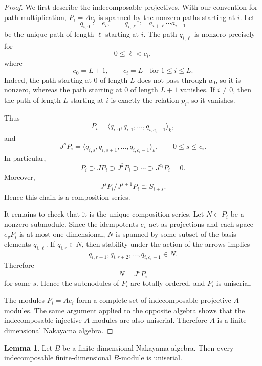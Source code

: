 \documentclass[11pt]{article}
\theoremstyle{definition}
\newtheorem{lemma}[theorem]{Lemma}
\begin{document}
\begin{proof}
We first describe the indecomposable projectives. With our convention for
path multiplication, \(P_i=Ae_i\) is spanned by the nonzero paths starting
at \(i\). Let
\[
q_{i,0}:=e_i,
\qquad
q_{i,\ell}:=a_{i+\ell}\cdots a_{i+1}
\]
be the unique path of length \(\ell\) starting at \(i\). The path \(q_{i,\ell}\)
is nonzero precisely for
\[
0\leq \ell<c_i,
\]
where
\[
c_0=L+1,
\qquad
c_i=L \quad \text{for } 1\leq i\leq L.
\]
Indeed, the path starting at \(0\) of length \(L\) does not pass through
\(a_0\), so it is nonzero, whereas the path starting at \(0\) of length
\(L+1\) vanishes. If \(i\neq 0\), then the path of length \(L\) starting
at \(i\) is exactly the relation \(p_i\), so it vanishes.

Thus
\[
P_i=\langle q_{i,0},q_{i,1},\ldots,q_{i,c_i-1}\rangle_k,
\]
and
\[
J^s P_i
=
\langle q_{i,s},q_{i,s+1},\ldots,q_{i,c_i-1}\rangle_k,
\qquad
0\leq s\leq c_i.
\]
In particular,
\[
P_i\supset JP_i\supset J^2P_i\supset\cdots\supset J^{c_i}P_i=0.
\]
Moreover,
\[
J^s P_i/J^{s+1} P_i\cong S_{i+s}.
\]
Hence this chain is a composition series.

It remains to check that it is the unique composition series. Let
\(N\subset P_i\) be a nonzero submodule. Since the idempotents \(e_v\)
act as projections and each space \(e_v P_i\) is at most one-dimensional,
\(N\) is spanned by some subset of the basis elements \(q_{i,\ell}\). If
\(q_{i,r}\in N\), then stability under the action of the arrows implies
\[
q_{i,r+1},q_{i,r+2},\ldots,q_{i,c_i-1}\in N.
\]
Therefore
\[
N=J^s P_i
\]
for some \(s\). Hence the submodules of \(P_i\) are totally ordered, and
\(P_i\) is uniserial.

The modules \(P_i=Ae_i\) form a complete set of indecomposable
projective \(A\)-modules. The same argument applied to the opposite
algebra shows that the indecomposable injective \(A\)-modules are also
uniserial. Therefore \(A\) is a finite-dimensional Nakayama algebra.
\end{proof}

\begin{lemma}
Let \(B\) be a finite-dimensional Nakayama algebra. Then every
indecomposable finite-dimensional \(B\)-module is uniserial.
\end{lemma}
\end{document}
